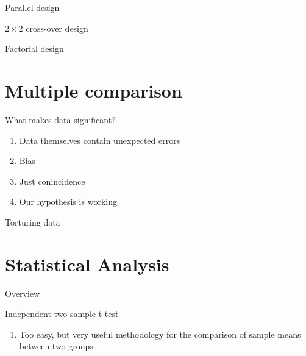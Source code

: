 \documentclass[9pt,ignorenonframetext,xcolor=dvipsnames]{beamer}
\providecommand{\tightlist}{%
  \setlength{\itemsep}{0pt}\setlength{\parskip}{0pt}}
\newlength{\wideitemsep}
\let\olditem\item
\renewcommand{\item}{\setlength{\itemsep}{\wideitemsep}\olditem}
\begin{document}
\begin{frame}{Parallel design}

\end{frame}

\begin{frame}{\(2\times 2\) cross-over design}

\end{frame}

\begin{frame}{Factorial design}

\end{frame}

\section{Multiple comparison}\label{multiple-comparison}

\begin{frame}{What makes data significant?}

\begin{enumerate}
\def\labelenumi{\arabic{enumi}.}
\tightlist
\item
  Data themselves contain unexpected errors
\item
  Bias
\item
  Just conincidence
\item
  Our hypothesis is working
\end{enumerate}

\end{frame}

\begin{frame}{Torturing data}

\end{frame}

\section{Statistical Analysis}\label{statistical-analysis}

\begin{frame}{Overview}

\end{frame}

\begin{frame}{Independent two sample t-test}

\begin{enumerate}
\def\labelenumi{\arabic{enumi}.}
\tightlist
\item
  Too easy, but very useful methodology for the comparison of sample
  means between two groups
\end{enumerate}

\end{frame}
\end{document}
